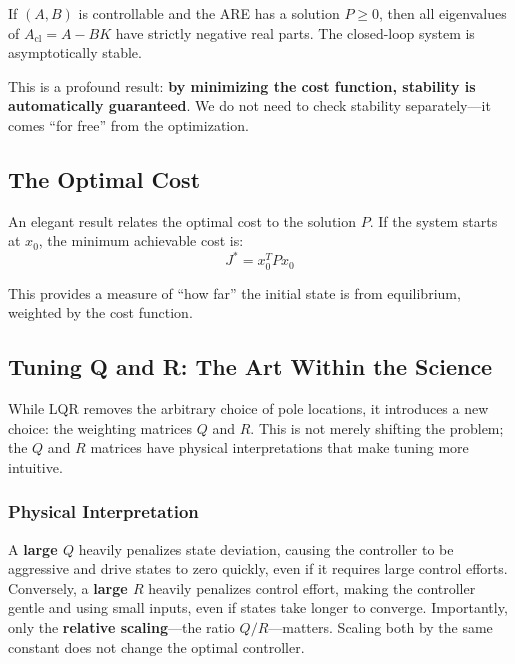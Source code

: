 \begin{theorem}
If $(A, B)$ is controllable and the ARE has a solution $P \geq 0$, then all eigenvalues of $A_{\text{cl}} = A - BK$ have strictly negative real parts. The closed-loop system is asymptotically stable.
\end{theorem}

This is a profound result: \textbf{by minimizing the cost function, stability is automatically guaranteed}. We do not need to check stability separately---it comes ``for free'' from the optimization.

\subsection{The Optimal Cost}

An elegant result relates the optimal cost to the solution $P$. If the system starts at $x_0$, the minimum achievable cost is:
\begin{equation}
\boxed{J^* = x_0^T P x_0}
\label{eq:optimal_cost}
\end{equation}

This provides a measure of ``how far'' the initial state is from equilibrium, weighted by the cost function.

\subsection{Tuning Q and R: The Art Within the Science}

While LQR removes the arbitrary choice of pole locations, it introduces a new choice: the weighting matrices $Q$ and $R$. This is not merely shifting the problem; the $Q$ and $R$ matrices have physical interpretations that make tuning more intuitive.

\subsubsection{Physical Interpretation}

A \textbf{large $Q$} heavily penalizes state deviation, causing the controller to be aggressive and drive states to zero quickly, even if it requires large control efforts. Conversely, a \textbf{large $R$} heavily penalizes control effort, making the controller gentle and using small inputs, even if states take longer to converge. Importantly, only the \textbf{relative scaling}---the ratio $Q/R$---matters. Scaling both by the same constant does not change the optimal controller.

